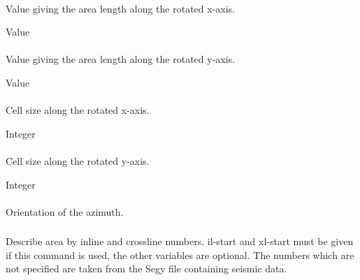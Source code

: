 \paragraph{}
 \slist
   \item \Description Value giving the area length along the rotated x-axis.
   \item \Argument Value
   \item \Default
 \elist

\paragraph{}
 \slist
   \item \Description Value giving the area length along the rotated y-axis.
   \item \Argument Value
   \item \Default
 \elist

\paragraph{}
 \slist
   \item \Description Cell size along the rotated x-axis.
   \item \Argument Integer
   \item \Default
 \elist

\paragraph{}
 \slist
   \item \Description Cell size along the rotated y-axis.
   \item \Argument Integer
   \item \Default
 \elist

\paragraph{}
 \slist
   \item \Description Orientation of the azimuth.
   \item \Argument
   \item \Default
 \elist

\subsubsection{}
 \slist
   \item \Description Describe area by inline and crossline numbers. il-start and xl-start must be given if this command is used, the other variables are optional. The numbers which are not specified are taken from the Segy file containing seismic data.
   \item \Argument 
   \item \Default
 \elist

